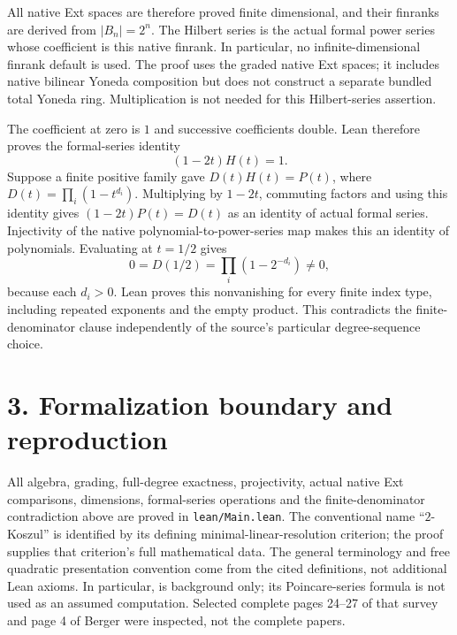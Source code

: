 \documentclass[10pt]{article}
\begin{document}
All native Ext spaces are therefore proved finite dimensional, and their
finranks are derived from $|B_n|=2^n$. The Hilbert series is the actual formal
power series whose coefficient is this native finrank. In particular, no
infinite-dimensional finrank default is used. The proof uses the graded
native Ext spaces; it includes native bilinear Yoneda composition but does
not construct a separate bundled total Yoneda ring. Multiplication is not
needed for this Hilbert-series assertion.

The coefficient at zero is $1$ and successive coefficients double. Lean
therefore proves the formal-series identity
\[
 (1-2t)H(t)=1.
\]
Suppose a finite positive family gave $D(t)H(t)=P(t)$, where
$D(t)=\prod_i(1-t^{d_i})$. Multiplying by $1-2t$, commuting factors and using
this identity gives $(1-2t)P(t)=D(t)$ as an identity of actual formal series.
Injectivity of the native polynomial-to-power-series map makes this an
identity of polynomials. Evaluating at $t=1/2$ gives
\[
 0=D(1/2)=\prod_i(1-2^{-d_i})\ne0,
\]
because each $d_i>0$. Lean proves this nonvanishing for every finite index
type, including repeated exponents and the empty product. This contradicts
the finite-denominator clause independently of the source's particular
degree-sequence choice.

\newpage
\section*{3. Formalization boundary and reproduction}
All algebra, grading, full-degree exactness, projectivity, actual native Ext
comparisons, dimensions, formal-series operations and the finite-denominator
contradiction above are proved in \texttt{lean/Main.lean}. The conventional
name ``$2$-Koszul'' is identified by its defining minimal-linear-resolution
criterion; the proof supplies that criterion's full mathematical data.
The general terminology and free quadratic presentation convention come from
the cited definitions, not additional Lean axioms. In particular,
\cite[Theorem 8.5]{MP} is background only; its Poincare-series formula is not
used as an assumed computation. Selected complete pages 24--27 of that survey
and page 4 of Berger were inspected, not the complete papers.
\end{document}
